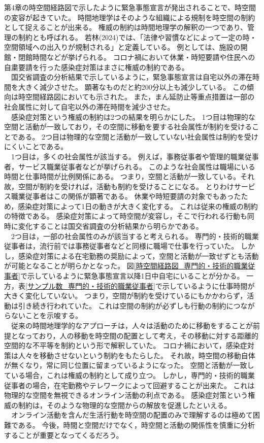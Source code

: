 \documentclass[paper={210mm,297mm},line_length=35zw,number_of_lines=31,head_space=30mm,gutter=40mm,baselineskip=2.0zw,headfoot_verticalposition=1.5zw]{jlreq}
\begin{document}
第4章の時空間経路図で示したように緊急事態宣言が発出されることで、時空間の変容が起きていた。
時間地理学はそのような組織による規制を時空間の制約として捉えることが出来る。
権威の制約は時間地理学の解釈の一つであり、管理の制約とも呼ばれる。
若林(2024)では、「法律や習慣などによって一定の時・空間領域への出入りが規制される」と定義している。
例としては、施設の開館・閉館時間などが挙げられる。
コロナ禍において休業・時短要請や住民への自粛要請を行った感染症対策はまさに権威の制約である。\\
　国交省調査の分析結果で示しているように，緊急事態宣言は自宅以外の滞在時間を大きく減少させた。
顕著なものだと約200分以上も減少している。
この傾向は時空間経路図においても示された。
また，まん延防止等重点措置は一部の社会属性に対して自宅以外の滞在時間を減少させた。\\
　感染症対策という権威の制約は2つの結果を明らかにした。
1つ目は物理的な空間と活動が一致しており，その空間に移動を要する社会属性が制約を受けることである。
2つ目は物理的な空間と活動が一致していない社会属性は制約を受けにくいことである。\\
　1つ目は，多くの社会属性が該当する。
例えば，事務従事者や管理的職業従事者，サービス職業従事者などが挙げられる。
このような社会属性は職場にいる時間と仕事時間が比例関係にある。
つまり，空間と活動が一致している。それ故，空間が制約を受ければ，活動も制約を受けることになる。
とりわけサービス職業従事者はこの関係が顕著である。
休業や時短要請の対象でもあったため，感染症対策によって1日の動きが大きく変化する。
これは従来の権威の制約の特徴である。
感染症対策によって時空間が変容し，そこで行われる行動も同時に変化することは国交省調査の分析結果から明らかである。\\
　2つ目は，一部の社会属性のみが該当すると考えられる。
専門的・技術的職業従事者は，流行前では事務従事者などと同様に職場で仕事を行っていた。
しかし，感染症対策による在宅勤務の奨励によって，空間と活動が一致せずとも活動が可能となることが明らかとなった。
図\ref{時空間経路図_専門的・技術的職業従事者}で示しているように緊急事態宣言以降1日中自宅にいることが分かる。
一方，表\ref{サンプル数_専門的・技術的職業従事者}で示しているように仕事時間が大きく変化していない。
つまり，空間が制約を受けているにもかかわらず，活動は引き続き行われていた。
これは空間の制約が必ずしも行動の制約につながらないことを示唆する。\\
　従来の時間地理学的なアプローチは，人々は活動のために移動をすることが前提となっており，人の移動を時空間の配置として考え，その移動に対する距離的空間的な不平等を制約という形で解釈していた。
コロナ禍において，感染症対策は人々を移動させないという制約をもたらした。
それ故，時空間の移動自体が無くなり，常に同じ位置に留まっているようになった。
空間と活動が一致している場合，これは権威の制約として成り立つ。
しかし，専門的・技術的職業従事者の場合，在宅勤務やテレワークによって回避することが出来た。
これは物理的な空間を無視できるオンライン活動の利点である。
感染症対策という権威の制約は，そのような物理的な空間からの解放を促進したといえる。\\
　オンライン活動を含んだ生活行動を時空間の配置のみで理解するのは極めて困難である。
今後，時間と空間だけでなく，時空間と活動の関係性を慎重に分析することが重要となってくるだろう。\\
\end{document}
